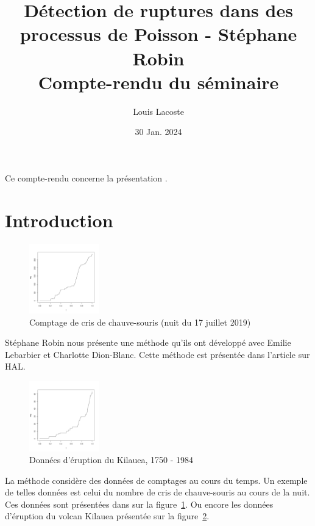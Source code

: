 \documentclass[a4paper,10pt]{article}\usepackage[]{graphicx}\usepackage[]{xcolor}
\title{\vspace{-1.5cm}\large Détection de ruptures dans des processus de Poisson - Stéphane Robin\\
\small Compte-rendu du séminaire\vspace{-0.5cm}}
\date{\small 30 Jan. 2024}
\author{\small Louis Lacoste}
\begin{document}
\maketitle

Ce compte-rendu concerne la présentation \cite{robinChangepointDetectionPoisson2019}.
\section{Introduction}

\begin{figure}
    \centering
    \vspace{-5pt}
    \includegraphics[width=0.27\textwidth]{graph-cris-chauve-souris}
    \vspace{-20pt}
    \caption{\small Comptage de cris de chauve-souris (nuit du 17 juillet 2019)}
    \label{fig:graph-cris-chauve-souris}
\end{figure}

Stéphane Robin nous présente une méthode qu'ils ont développé avec Emilie Lebarbier
et Charlotte Dion-Blanc. Cette méthode est présentée dans l'article 
\cite{dion-blancDetectionRupturesMultiples2023} sur HAL.

\begin{figure}
    \centering
    \vspace{-20pt}
    \includegraphics[width=0.27\textwidth]{graph-eruption-kilauea}
    \vspace{-20pt}
    \caption{Données d'éruption du Kilauea, 1750 - 1984}
    \label{fig:graph-eruption-kilauea}
\end{figure}

La méthode considère des données de comptages au cours du temps. Un exemple de 
telles données est celui du nombre de cris de chauve-souris au cours de la nuit.
Ces données sont présentées dans sur la figure~\ref{fig:graph-cris-chauve-souris}.
Ou encore les données d'éruption du volcan Kilauea présentée sur la figure~\ref{fig:graph-eruption-kilauea}.
\end{document}
